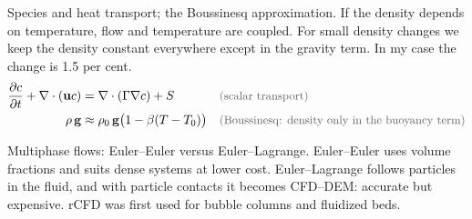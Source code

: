 \begin{qabox}{Species and heat transport; the Boussinesq approximation.}
\explain If the density depends on temperature, flow and temperature are coupled. For small density
changes we keep the density constant everywhere except in the gravity term. In my case the change
is 1.5 per cent.
\derive
\begin{align*}
\frac{\partial c}{\partial t} + \nabla\cdot(\mathbf{u}c) &= \nabla\cdot(\Gamma\nabla c) + S \why{scalar transport} \\
\rho\,\mathbf{g} &\approx \rho_0\,\mathbf{g}\bigl(1 - \beta(T-T_0)\bigr) \why{Boussinesq: density only in the buoyancy term}
\end{align*}
\end{qabox}

\begin{qabox}{Multiphase flows: Euler--Euler versus Euler--Lagrange.}
\explain Euler--Euler uses volume fractions and suits dense systems at lower cost. Euler--Lagrange
follows particles in the fluid, and with particle contacts it becomes CFD--DEM: accurate but
expensive. rCFD was first used for bubble columns and fluidized beds.
\end{qabox}

